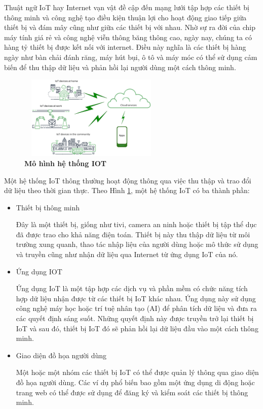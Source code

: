 \documentclass{article} %
\begin{document}
	Thuật ngữ IoT hay Internet vạn vật đề cập đến mạng lưới tập hợp các thiết bị thông minh và công nghệ tạo điều kiện thuận lợi cho hoạt động giao tiếp giữa thiết bị và đám mây cũng như giữa các thiết bị với nhau. Nhờ sự ra đời của chip máy tính giá rẻ và công nghệ viễn thông băng thông cao, ngày nay, chúng ta có hàng tỷ thiết bị được kết nối với internet. Điều này nghĩa là các thiết bị hàng ngày như bàn chải đánh răng, máy hút bụi, ô tô và máy móc có thể sử dụng cảm biến để thu thập dữ liệu và phản hồi lại người dùng một cách thông minh.
	
	\begin{figure}[!ht]
		\centering
		\includegraphics[width=7cm,height=4cm]{Images/introIOT.png}
		\caption[Mô hình hệ thống IOT\cite{IOT}]{\bfseries \fontsize{12pt}{0pt}\selectfont Mô hình hệ thống IOT\cite{IOT}}
		\label{introIOT}
	\end{figure}
	
	Một hệ thống IoT thông thường hoạt động thông qua việc thu thập và trao đổi dữ liệu theo thời gian thực. Theo Hình \ref{introIOT}, một hệ thống IoT có ba thành phần:
	
	
	\begin{itemize}
		\item Thiết bị thông minh
		
		Đây là một thiết bị, giống như tivi, camera an ninh hoặc thiết bị tập thể dục đã được trao cho khả năng điện toán. Thiết bị này thu thập dữ liệu từ môi trường xung quanh, thao tác nhập liệu của người dùng hoặc mô thức sử dụng và truyền cũng như nhận dữ liệu qua Internet từ ứng dụng IoT của nó.
		
		\item Ứng dụng IOT %
		
		Ứng dụng IoT là một tập hợp các dịch vụ và phần mềm có chức năng tích hợp dữ liệu nhận được từ các thiết bị IoT khác nhau. Ứng dụng này sử dụng công nghệ máy học hoặc trí tuệ nhân tạo (AI) để phân tích dữ liệu và đưa ra các quyết định sáng suốt. Những quyết định này được truyền trở lại thiết bị IoT và sau đó, thiết bị IoT đó sẽ phản hồi lại dữ liệu đầu vào một cách thông minh. 
		\item Giao diện đồ họa người dùng
		
		Một hoặc một nhóm các thiết bị IoT có thể được quản lý thông qua giao diện đồ họa người dùng. Các ví dụ phổ biến bao gồm một ứng dụng di động hoặc trang web có thể được sử dụng để đăng ký và kiểm soát các thiết bị thông minh.
	\end{itemize}
	
\end{document}
